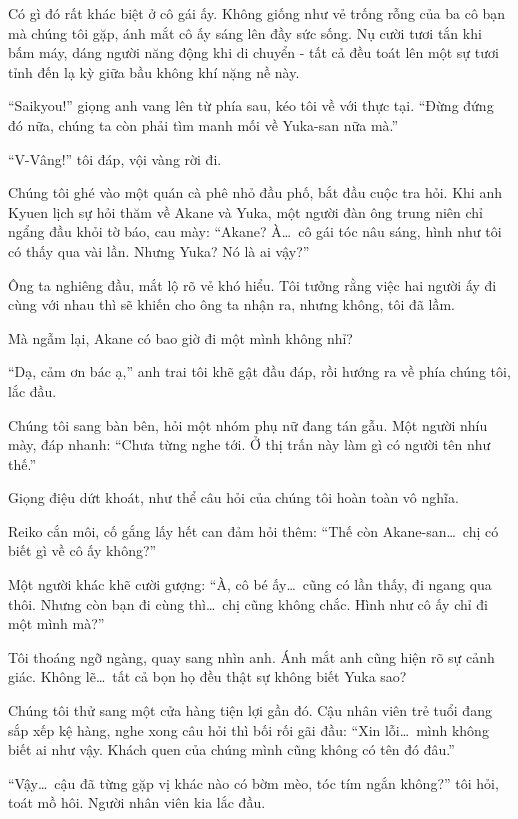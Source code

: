 \documentclass[../main.tex]{subfiles}
\begin{document}
Có gì đó rất khác biệt ở cô gái ấy. Không giống như vẻ trống rỗng của ba cô bạn mà chúng tôi gặp, ánh mắt cô ấy sáng lên đầy sức sống. Nụ cười tươi tắn khi bấm máy, dáng người năng động khi di chuyển - tất cả đều toát lên một sự tươi tỉnh đến lạ kỳ giữa bầu không khí nặng nề này.

``Saikyou!'' giọng anh vang lên từ phía sau, kéo tôi về với thực tại. ``Đừng đứng đó nữa, chúng ta còn phải tìm manh mối về Yuka-san nữa mà.''

``V-Vâng!'' tôi đáp, vội vàng rời đi.

\ct

Chúng tôi ghé vào một quán cà phê nhỏ đầu phố, bắt đầu cuộc tra hỏi. Khi anh Kyuen lịch sự hỏi thăm về Akane và Yuka, một người đàn ông trung niên chỉ ngẩng đầu khỏi tờ báo, cau mày: ``Akane? À\dots\ cô gái tóc nâu sáng, hình như tôi có thấy qua vài lần. Nhưng Yuka? Nó là ai vậy?''

Ông ta nghiêng đầu, mắt lộ rõ vẻ khó hiểu. Tôi tưởng rằng việc hai người ấy đi cùng với nhau thì sẽ khiến cho ông ta nhận ra, nhưng không, tôi đã lầm.

Mà ngẫm lại, Akane có bao giờ đi một mình không nhỉ?

``Dạ, cảm ơn bác ạ,'' anh trai tôi khẽ gật đầu đáp, rồi hướng ra về phía chúng tôi, lắc đầu.

Chúng tôi sang bàn bên, hỏi một nhóm phụ nữ đang tán gẫu. Một người nhíu mày, đáp nhanh: ``Chưa từng nghe tới. Ở thị trấn này làm gì có người tên như thế.''

Giọng điệu dứt khoát, như thể câu hỏi của chúng tôi hoàn toàn vô nghĩa.

Reiko cắn môi, cố gắng lấy hết can đảm hỏi thêm: ``Thế còn Akane-san\dots\ chị có biết gì về cô ấy không?''

Một người khác khẽ cười gượng: ``À, cô bé ấy\dots\ cũng có lần thấy, đi ngang qua thôi. Nhưng còn bạn đi cùng thì\dots\ chị cũng không chắc. Hình như cô ấy chỉ đi một mình mà?''

Tôi thoáng ngỡ ngàng, quay sang nhìn anh. Ánh mắt anh cũng hiện rõ sự cảnh giác. Không lẽ\dots\ tất cả bọn họ đều thật sự không biết Yuka sao?

Chúng tôi thử sang một cửa hàng tiện lợi gần đó. Cậu nhân viên trẻ tuổi đang sắp xếp kệ hàng, nghe xong câu hỏi thì bối rối gãi đầu: ``Xin lỗi\dots\ mình không biết ai như vậy. Khách quen của chúng mình cũng không có tên đó đâu.''

``Vậy\dots\ cậu đã từng gặp vị khác nào có bờm mèo, tóc tím ngắn không?'' tôi hỏi, toát mồ hôi. Người nhân viên kia lắc đầu.
\end{document}

